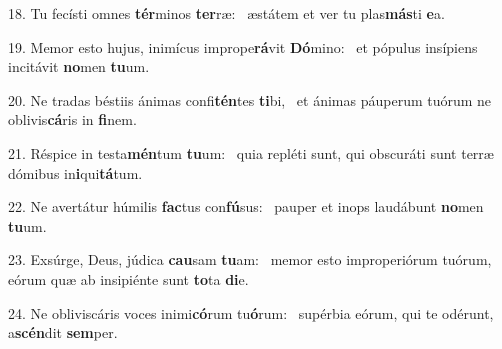 18. Tu fecísti omnes \textbf{tér}minos \textbf{ter}ræ: \ast\  æstátem et ver tu plas\textbf{más}ti \textbf{e}a.\

19. Memor esto hujus, inimícus imprope\textbf{rá}vit \textbf{Dó}mino: \ast\  et pópulus insípiens incitávit \textbf{no}men \textbf{tu}um.\

20. Ne tradas béstiis ánimas confi\textbf{tén}tes \textbf{ti}bi, \ast\  et ánimas páuperum tuórum ne oblivis\textbf{cá}ris in \textbf{fi}nem.\

21. Réspice in testa\textbf{mén}tum \textbf{tu}um: \ast\  quia repléti sunt, qui obscuráti sunt terræ dómibus in\textbf{i}qui\textbf{tá}tum.\

22. Ne avertátur húmilis \textbf{fac}tus con\textbf{fú}sus: \ast\  pauper et inops laudábunt \textbf{no}men \textbf{tu}um.\

23. Exsúrge, Deus, júdica \textbf{cau}sam \textbf{tu}am: \ast\  memor esto improperiórum tuórum, eórum quæ ab insipiénte sunt \textbf{to}ta \textbf{di}e.\

24. Ne obliviscáris voces inimi\textbf{có}rum tu\textbf{ó}rum: \ast\  supérbia eórum, qui te odérunt, a\textbf{scén}dit \textbf{sem}per.\

